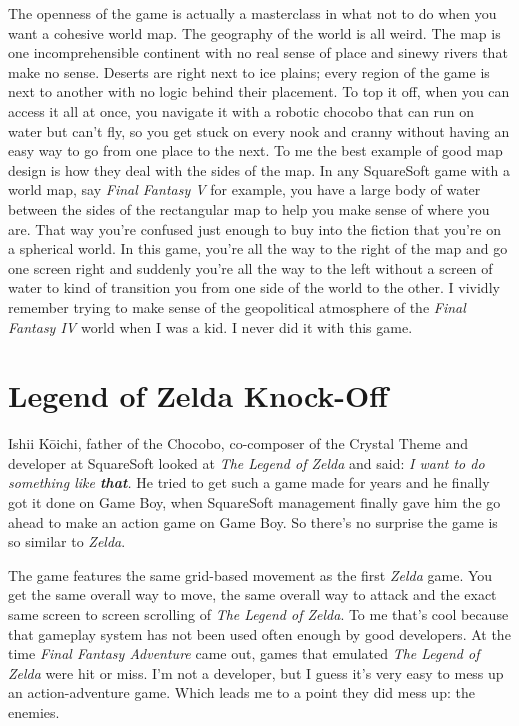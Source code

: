 \documentclass{book}
\begin{document}
The openness of the game is actually a masterclass in what not to do when you want a cohesive world map. The geography of the world is all weird. The map is one incomprehensible continent with no real sense of place and sinewy rivers that make no sense. Deserts are right next to ice plains; every region of the game is next to another with no logic behind their placement. To top it off, when you can access it all at once, you navigate it with a robotic chocobo that can run on water but can’t fly, so you get stuck on every nook and cranny without having an easy way to go from one place to the next. To me the best example of good map design is how they deal with the sides of the map. In any SquareSoft game with a world map, say \emph{Final Fantasy V} for example, you have a large body of water between the sides of the rectangular map to help you make sense of where you are. That way you’re confused just enough to buy into the fiction that you’re on a spherical world. In this game, you’re all the way to the right of the map and go one screen right and suddenly you’re all the way to the left without a screen of water to kind of transition you from one side of the world to the other. I vividly remember trying to make sense of the geopolitical atmosphere of the \emph{Final Fantasy IV} world when I was a kid. I never did it with this game.\par
\FloatBarrier\section*{Legend of Zelda Knock-Off}
Ishii Kōichi, father of the Chocobo, co-composer of the Crystal Theme and developer at SquareSoft looked at \emph{The Legend of Zelda} and said: \emph{I want to do something like \textbf{that}.} He tried to get such a game made for years and he finally got it done on Game Boy, when SquareSoft management finally gave him the go ahead to make an action game on Game Boy. So there’s no surprise the game is so similar to \emph{Zelda}.\par
The game features the same grid-based movement as the first \emph{Zelda} game. You get the same overall way to move, the same overall way to attack and the exact same screen to screen scrolling of \emph{The Legend of Zelda}. To me that’s cool because that gameplay system has not been used often enough by good developers. At the time \emph{Final Fantasy Adventure} came out, games that emulated \emph{The Legend of Zelda} were hit or miss. I’m not a developer, but I guess it’s very easy to mess up an action-adventure game. Which leads me to a point they did mess up: the enemies.\par
\end{document}
